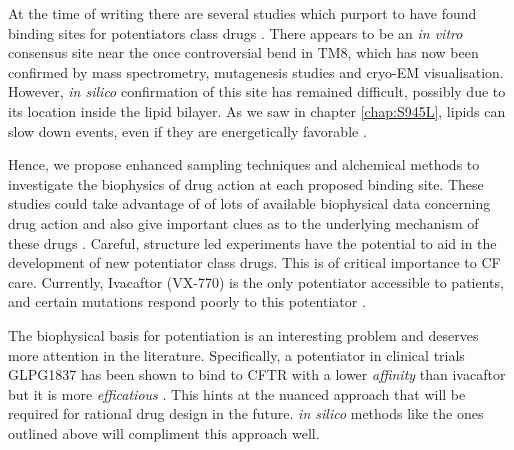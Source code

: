 At the time of writing there are several studies which purport to have found binding sites for potentiators class drugs \cite{yeh2019, laselva2021a, liu2019, baatallah2021}. There appears to be an \textit {in vitro} consensus site near the once controversial bend in TM8, which has now been confirmed by mass spectrometry, mutagenesis studies and cryo-EM visualisation. However, \textit{in silico} confirmation of this site has remained difficult, possibly due to its location inside the lipid bilayer. As we saw in chapter \ref{chap:S945L}, lipids can slow down events, even if they are energetically favorable \cite{laselva2021a}. 

Hence, we propose enhanced sampling techniques and alchemical methods to investigate the biophysics of drug action at each proposed binding site. These studies could take advantage of of lots of available biophysical data concerning drug action and also give important clues as to the underlying mechanism of these drugs \cite{yeh2017, yeh2019,csanady2019}. Careful, structure led experiments have the potential to aid in the development of new potentiator class drugs. This is of critical importance to CF care. Currently, Ivacaftor (VX-770) is the only potentiator accessible to patients, and certain mutations respond poorly to this potentiator \cite{phuan2018, vangoor2014}. 

The biophysical basis for potentiation is an interesting problem and deserves more attention in the literature. Specifically, a potentiator in clinical trials GLPG1837 has been shown to bind to CFTR with a lower \textit{affinity} than ivacaftor but it is more \textit{efficatious} \cite{yeh2019, yeh2017,vanderplas2018}. This hints at the nuanced approach that will be required for rational drug design in the future. \textit{in silico} methods like the ones outlined above will compliment this approach well.

